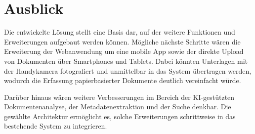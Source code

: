 \section{Ausblick}

Die entwickelte Lösung stellt eine Basis dar, auf der weitere Funktionen und Erweiterungen
aufgebaut werden können.
Mögliche nächste Schritte wären die Erweiterung der Webanwendung um eine mobile
App sowie der direkte Upload von Dokumenten über Smartphones und Tablets. Dabei
könnten Unterlagen mit der Handykamera fotografiert und unmittelbar in das
System übertragen werden, wodurch die Erfassung papierbasierter Dokumente
deutlich vereinfacht würde.

Darüber hinaus wären weitere Verbesserungen im Bereich der KI-gestützten
Dokumentenanalyse, der Metadatenextraktion und der Suche denkbar. Die gewählte
Architektur ermöglicht es, solche Erweiterungen schrittweise in das bestehende
System zu integrieren.
